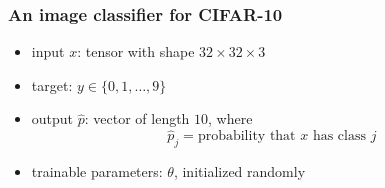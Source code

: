 \documentclass{beamer}
\begin{document}
    \begin{frame}
        \frametitle{An image classifier for CIFAR-10}

        \begin{center}
        \end{center}

        \begin{itemize}
            \setlength\itemsep{1em}
            \item input $x$: tensor with shape $32\times32\times3$
            \item target: $y\in\{0,1,\ldots,9\}$
            \item output $\widehat{p}$: vector of length $10$, where
            \[
                \widehat{p}_j = \text{probability that $x$ has class $j$}
            \]
            \item trainable parameters: $\theta$, initialized randomly
        \end{itemize}
    \end{frame}
\end{document}
